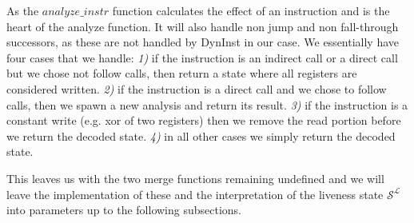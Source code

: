 
As the $analyze\_instr$ function calculates the effect of an instruction and is the heart of the analyze function. It will also handle non jump 
and non fall-through successors, as these are not handled by DynInst in our case. We essentially have four cases that we handle:
\textit{1)} if the instruction is an indirect call or a direct call but we chose not follow calls, then return a state where all registers are considered written.
\textit{2)} if the instruction is a direct call and we chose to follow calls, then we spawn a new analysis and return its result.
\textit{3)} if the instruction is a constant write (e.g. xor of two registers) then we remove the read portion before we return the decoded state.
\textit{4)} in all other cases we simply return the decoded state.

This leaves us with the two merge functions remaining undefined and we will leave the implementation of these and the interpretation of the  liveness state $\mathcal{S}^\mathcal{L}$ into parameters up to the following subsections.

